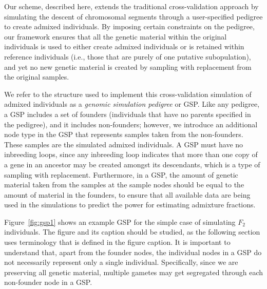 Our scheme, described here, extends the traditional cross-validation approach
by simulating the descent of chromosomal segments through a user-specified
pedigree to create admixed individuals.  By imposing certain constraints
on the pedigree, our framework ensures that all the genetic material
within the original individuals is used to either create admixed individuals or is retained
within reference individuals (i.e., those that are purely of one
putative subopulation), and yet no new genetic material is
created by sampling with replacement from the original samples.

We refer to the structure used to implement this cross-validation simulation
of admixed individuals as
a {\em genomic simulation pedigree} or GSP.  Like any pedigree,
a GSP includes a set of founders (individuals that have no parents specified in the
pedigree), and it includes non-founders; however, we introduce an additional node
type in the GSP that represents samples taken from the non-founders. These samples
are the simulated admixed individuals.  A GSP must have no inbreeding loops, since
any inbreeding loop indicates that more than one copy of a gene in an ancestor may
be created amongst its descendants, which is a type of sampling with
replacement.  Furthermore, in a GSP, the amount of genetic material taken from the
samples at the sample nodes should be equal to the amount of material in the founders,
to ensure that all available data are being used in the simulations to predict the power for
estimating admixture fractions.

Figure~\ref{fig:gsp1} shows an example GSP for the simple case
of simulating $F_2$ individuals. The figure and its caption
should be studied, as the following section
uses terminology that is defined in the figure caption.
It is important to understand that, apart from the founder nodes, the individual
nodes in a GSP do not necessarily represent only a single individual.  Specifically,
since we are preserving all genetic material, multiple gametes may get segregated
through each non-founder node in a GSP\@.

